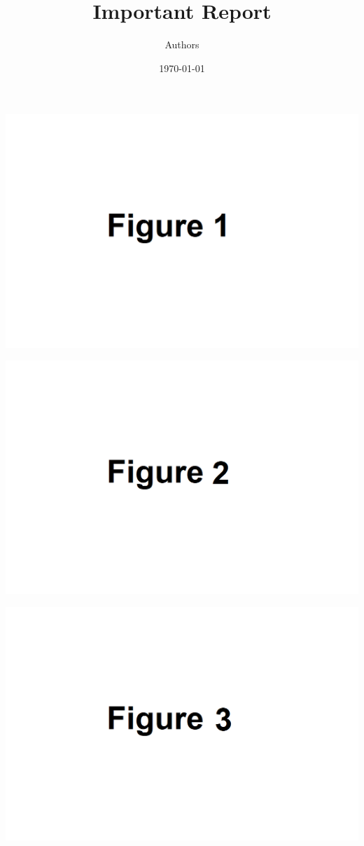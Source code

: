 \documentclass{article}
\title{Important Report}
\author{Authors}
\date{\today}
\begin{document}
 
 
\maketitle 
\newpage 

\includegraphics[width=1.0\textwidth]{test_figs/test-fig1.png}
 \newpage

\includegraphics[width=1.0\textwidth]{test_figs/test-fig2.png}
 \newpage

\includegraphics[width=1.0\textwidth]{test_figs/test-fig3.png}
 \newpage
\end{document}
